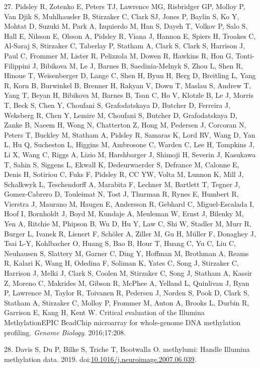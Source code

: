 \documentclass[]{article}
\begin{document}
\leavevmode\hypertarget{ref-Pidsley2016}{}%
27. Pidsley R, Zotenko E, Peters TJ, Lawrence MG, Risbridger GP, Molloy
P, Van Djik S, Muhlhausler B, Stirzaker C, Clark SJ, Jones P, Baylin S,
Ko Y, Mohtat D, Suzuki M, Park A, Izquierdo M, Han S, Dayeh T, Volkov P,
Salo S, Hall E, Nilsson E, Olsson A, Pidsley R, Viana J, Hannon E,
Spiers H, Troakes C, Al-Saraj S, Stirzaker C, Taberlay P, Statham A,
Clark S, Clark S, Harrison J, Paul C, Frommer M, Lister R, Pelizzola M,
Dowen R, Hawkins R, Hon G, Tonti-Filippini J, Bibikova M, Le J, Barnes
B, Saedinia-Melnyk S, Zhou L, Shen R, Hinoue T, Weisenberger D, Lange C,
Shen H, Byun H, Berg D, Breitling L, Yang R, Korn B, Burwinkel B,
Brenner H, Rakyan V, Down T, Maslau S, Andrew T, Yang T, Beyan H,
Bibikova M, Barnes B, Tsan C, Ho V, Klotzle B, Le J, Morris T, Beck S,
Chen Y, Choufani S, Grafodatskaya D, Butcher D, Ferreira J, Weksberg R,
Chen Y, Lemire M, Choufani S, Butcher D, Grafodatskaya D, Zanke B, Naeem
H, Wong N, Chatterton Z, Hong M, Pedersen J, Corcoran N, Peters T,
Buckley M, Statham A, Pidsley R, Samaras K, Lord RV, Wang D, Yan L, Hu
Q, Sucheston L, Higgins M, Ambrosone C, Warden C, Lee H, Tompkins J, Li
X, Wang C, Riggs A, Lizio M, Harshbarger J, Shimoji H, Severin J,
Kasukawa T, Sahin S, Siggens L, Ekwall K, Dedeurwaerder S, Defrance M,
Calonne E, Denis H, Sotiriou C, Fuks F, Pidsley R, CC YW, Volta M,
Lunnon K, Mill J, Schalkwyk L, Teschendorff A, Marabita F, Lechner M,
Bartlett T, Tegner J, Gomez-Cabrero D, Touleimat N, Tost J, Thurman R,
Rynes E, Humbert R, Vierstra J, Maurano M, Haugen E, Andersson R,
Gebhard C, Miguel-Escalada I, Hoof I, Bornholdt J, Boyd M, Kundaje A,
Meuleman W, Ernst J, Bilenky M, Yen A, Ritchie M, Phipson B, Wu D, Hu Y,
Law C, Shi W, Stadler M, Murr R, Burger L, Ivanek R, Lienert F, Schöler
A, Ziller M, Gu H, Müller F, Donaghey J, Tsai L-Y, Kohlbacher O, Huang
S, Bao B, Hour T, Huang C, Yu C, Liu C, Neuhausen S, Slattery M, Garner
C, Ding Y, Hoffman M, Brothman A, Reams R, Kalari K, Wang H, Odedina F,
Soliman K, Yates C, Song J, Stirzaker C, Harrison J, Melki J, Clark S,
Coolen M, Stirzaker C, Song J, Statham A, Kassir Z, Moreno C, Makrides
M, Gibson R, McPhee A, Yelland L, Quinlivan J, Ryan P, Lawrence M,
Taylor R, Toivanen R, Pedersen J, Norden S, Pook D, Clark S, Statham A,
Stirzaker C, Molloy P, Frommer M, Auton A, Brooks L, Durbin R, Garrison
E, Kang H, Kent W. Critical evaluation of the Illumina MethylationEPIC
BeadChip microarray for whole-genome DNA methylation profiling.
\emph{Genome Biology}. 2016;17:208.

\leavevmode\hypertarget{ref-Davis2019}{}%
28. Davis S, Du P, Bilke S, Triche T, Bootwalla O. methylumi: Handle
Illumina methylation data. 2019.
doi:\href{https://doi.org/10.1016/j.neuroimage.2007.06.039}{10.1016/j.neuroimage.2007.06.039}.
\end{document}
